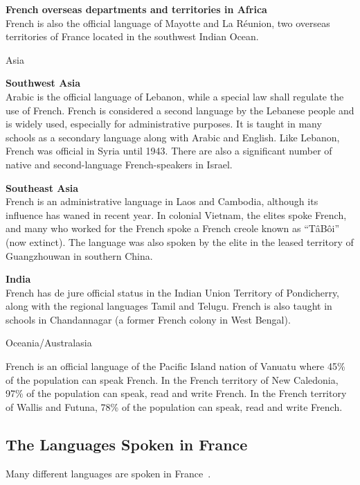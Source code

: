 \begin{multicols}{2}
{\bf French overseas departments and territories in Africa}\\
French is also the official language of Mayotte and La Réunion, two
overseas territories of France located in the southwest Indian Ocean.

\vspace{1cm}
\begin{center}
{\sc Asia}
\end{center}

{\bf Southwest Asia}\\ 
Arabic is the official language of Lebanon, while a special law shall
regulate the use of French. French is considered a second language by
the Lebanese people and is widely used, especially for administrative
purposes. It is taught in many schools as a secondary language along
with Arabic and English. Like Lebanon, French was official in Syria
until 1943. There are also a significant number of native and
second-language French-speakers in Israel.

{\bf Southeast Asia }\\
French is an administrative language in Laos and Cambodia, although
its influence has waned in recent year. In colonial Vietnam, the
elites spoke French, and many who worked for the French spoke a French
creole known as ``TâBôi'' (now extinct). The language was also spoken
by the elite in the leased territory of Guangzhouwan in southern
China.

{\bf India}\\
French has de jure official status in the Indian Union Territory of
Pondicherry, along with the regional languages Tamil and
Telugu. French is also taught in schools in Chandannagar (a former
French colony in West Bengal).

\vspace{0.5cm}
\begin{center}
{\sc Oceania/Australasia}
\end{center}
French is an official language of the Pacific Island nation of Vanuatu
where 45\% of the population can speak French. In the French territory
of New Caledonia, 97\% of the population can speak, read and write
French. In the French territory of Wallis and Futuna, 78\% of the
population can speak, read and write French.

\subsection{The Languages Spoken in France}
\label{languageSpokenInTheFranceEn}
Many different languages are spoken in France~\cite{francais}.


\end{multicols}
